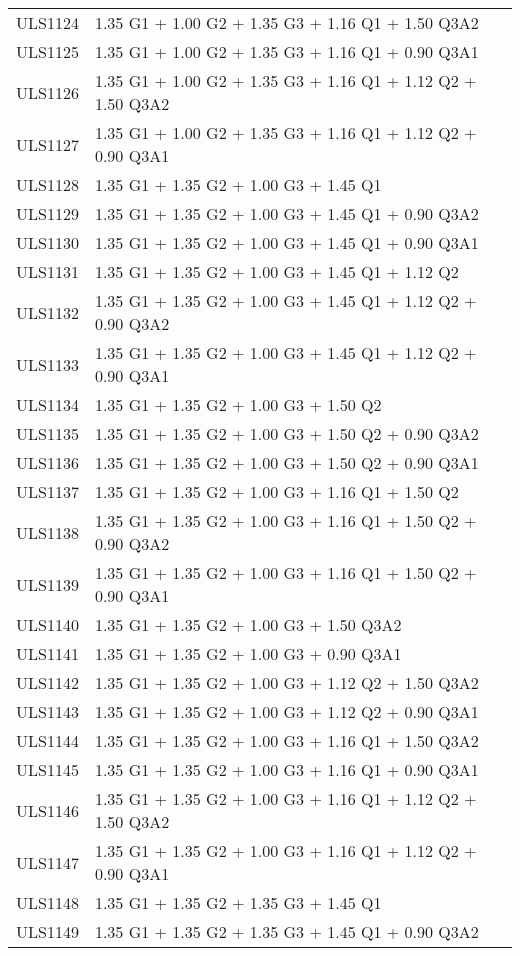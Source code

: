 \begin{center}
\begin{small}
\begin{longtable}{|l|p{10cm}|}
ULS1124 & 1.35 G1 + 1.00 G2 + 1.35 G3 + 1.16 Q1 + 1.50 Q3A2\\
ULS1125 & 1.35 G1 + 1.00 G2 + 1.35 G3 + 1.16 Q1 + 0.90 Q3A1\\
ULS1126 & 1.35 G1 + 1.00 G2 + 1.35 G3 + 1.16 Q1 + 1.12 Q2 + 1.50 Q3A2\\
ULS1127 & 1.35 G1 + 1.00 G2 + 1.35 G3 + 1.16 Q1 + 1.12 Q2 + 0.90 Q3A1\\
ULS1128 & 1.35 G1 + 1.35 G2 + 1.00 G3 + 1.45 Q1\\
ULS1129 & 1.35 G1 + 1.35 G2 + 1.00 G3 + 1.45 Q1 + 0.90 Q3A2\\
ULS1130 & 1.35 G1 + 1.35 G2 + 1.00 G3 + 1.45 Q1 + 0.90 Q3A1\\
ULS1131 & 1.35 G1 + 1.35 G2 + 1.00 G3 + 1.45 Q1 + 1.12 Q2\\
ULS1132 & 1.35 G1 + 1.35 G2 + 1.00 G3 + 1.45 Q1 + 1.12 Q2 + 0.90 Q3A2\\
ULS1133 & 1.35 G1 + 1.35 G2 + 1.00 G3 + 1.45 Q1 + 1.12 Q2 + 0.90 Q3A1\\
ULS1134 & 1.35 G1 + 1.35 G2 + 1.00 G3 + 1.50 Q2\\
ULS1135 & 1.35 G1 + 1.35 G2 + 1.00 G3 + 1.50 Q2 + 0.90 Q3A2\\
ULS1136 & 1.35 G1 + 1.35 G2 + 1.00 G3 + 1.50 Q2 + 0.90 Q3A1\\
ULS1137 & 1.35 G1 + 1.35 G2 + 1.00 G3 + 1.16 Q1 + 1.50 Q2\\
ULS1138 & 1.35 G1 + 1.35 G2 + 1.00 G3 + 1.16 Q1 + 1.50 Q2 + 0.90 Q3A2\\
ULS1139 & 1.35 G1 + 1.35 G2 + 1.00 G3 + 1.16 Q1 + 1.50 Q2 + 0.90 Q3A1\\
ULS1140 & 1.35 G1 + 1.35 G2 + 1.00 G3 + 1.50 Q3A2\\
ULS1141 & 1.35 G1 + 1.35 G2 + 1.00 G3 + 0.90 Q3A1\\
ULS1142 & 1.35 G1 + 1.35 G2 + 1.00 G3 + 1.12 Q2 + 1.50 Q3A2\\
ULS1143 & 1.35 G1 + 1.35 G2 + 1.00 G3 + 1.12 Q2 + 0.90 Q3A1\\
ULS1144 & 1.35 G1 + 1.35 G2 + 1.00 G3 + 1.16 Q1 + 1.50 Q3A2\\
ULS1145 & 1.35 G1 + 1.35 G2 + 1.00 G3 + 1.16 Q1 + 0.90 Q3A1\\
ULS1146 & 1.35 G1 + 1.35 G2 + 1.00 G3 + 1.16 Q1 + 1.12 Q2 + 1.50 Q3A2\\
ULS1147 & 1.35 G1 + 1.35 G2 + 1.00 G3 + 1.16 Q1 + 1.12 Q2 + 0.90 Q3A1\\
ULS1148 & 1.35 G1 + 1.35 G2 + 1.35 G3 + 1.45 Q1\\
ULS1149 & 1.35 G1 + 1.35 G2 + 1.35 G3 + 1.45 Q1 + 0.90 Q3A2\\

\end{longtable}
\end{small}
\end{center}
